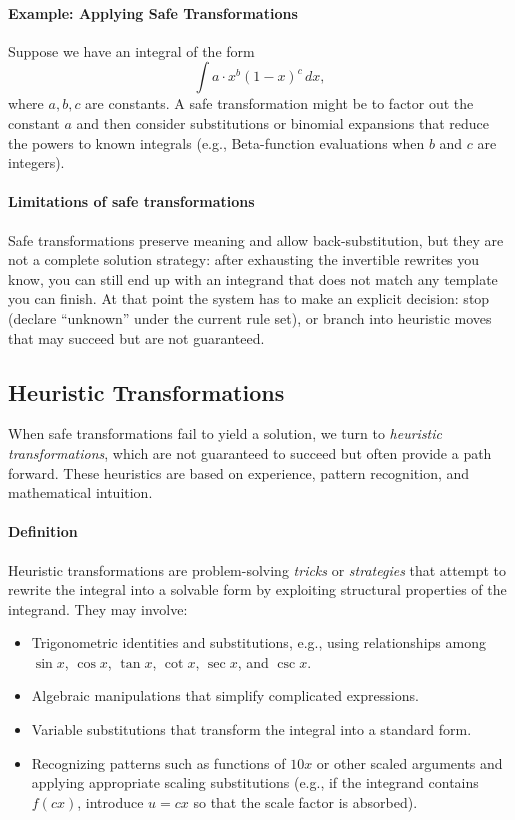 \paragraph{Example: Applying Safe Transformations}

Suppose we have an integral of the form
\[
\int a \cdot x^{b} (1 - x)^{c} \, dx,
\]
where \(a, b, c\) are constants. A safe transformation might be to factor out the constant \(a\) and then consider substitutions or binomial expansions that reduce the powers to known integrals (e.g., Beta-function evaluations when \(b\) and \(c\) are integers).

\paragraph{Limitations of safe transformations}
\label{sec:symbolic_limitations_of_safe_transformations}
Safe transformations preserve meaning and allow back-substitution, but they are not a complete solution strategy: after exhausting the invertible rewrites you know, you can still end up with an integrand that does not match any template you can finish. At that point the system has to make an explicit decision: stop (declare ``unknown'' under the current rule set), or branch into heuristic moves that may succeed but are not guaranteed.

\subsection{Heuristic Transformations}
\label{sec:symbolic_heuristic_transformations}

When safe transformations fail to yield a solution, we turn to \emph{heuristic transformations}, which are not guaranteed to succeed but often provide a path forward. These heuristics are based on experience, pattern recognition, and mathematical intuition.

\paragraph{Definition}

Heuristic transformations are problem-solving \emph{tricks} or \emph{strategies} that attempt to rewrite the integral into a solvable form by exploiting structural properties of the integrand. They may involve:

\begin{itemize}
  \item Trigonometric identities and substitutions, e.g., using relationships among \(\sin x\), \(\cos x\), \(\tan x\), \(\cot x\), \(\sec x\), and \(\csc x\).
  \item Algebraic manipulations that simplify complicated expressions.
  \item Variable substitutions that transform the integral into a standard form.
  \item Recognizing patterns such as functions of \(10x\) or other scaled arguments and applying appropriate scaling substitutions (e.g., if the integrand contains \(f(cx)\), introduce \(u = cx\) so that the scale factor is absorbed).
\end{itemize}

